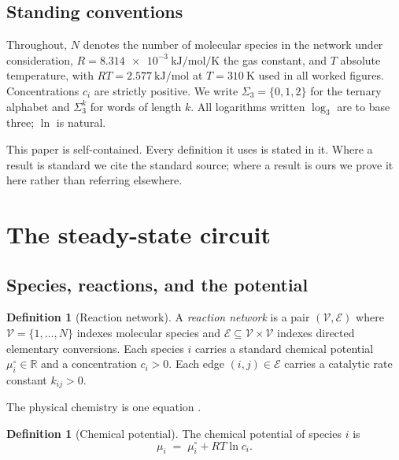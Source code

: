 \documentclass[11pt,twocolumn,a4paper]{article}
\theoremstyle{plain}
\theoremstyle{definition}
\newtheorem{definition}[theorem]{Definition}
\theoremstyle{remark}
\newcommand{\Trits}{\Sigma_3}
\newcommand{\Rset}{\mathbb{R}}
\begin{document}
\subsection{Standing conventions}

Throughout, $N$ denotes the number of molecular species in the network under
consideration, $R = \SI{8.314e-3}{\kilo\joule\per\mole\per\kelvin}$ the gas
constant, and $T$ absolute temperature, with $RT = \SI{2.577}{\kilo\joule\per\mole}$
at $T = \SI{310}{\kelvin}$ used in all worked figures. Concentrations $c_i$ are
strictly positive. We write $\Trits = \{0,1,2\}$ for the ternary alphabet and
$\Trits^k$ for words of length $k$. All logarithms written $\log_3$ are to base
three; $\ln$ is natural.

This paper is self-contained. Every definition it uses is stated in it. Where a
result is standard we cite the standard source; where a result is ours we prove
it here rather than referring elsewhere.

\section{The steady-state circuit}
\label{sec:circuit}

\subsection{Species, reactions, and the potential}

\begin{definition}[Reaction network]
\label{def:network}
A \emph{reaction network} is a pair $(\mathcal{V},\mathcal{E})$ where
$\mathcal{V} = \{1,\dots,N\}$ indexes molecular species and
$\mathcal{E}\subseteq \mathcal{V}\times\mathcal{V}$ indexes directed elementary
conversions. Each species $i$ carries a standard chemical potential
$\mu_i^\circ \in \Rset$ and a concentration $c_i > 0$. Each edge
$(i,j)\in\mathcal{E}$ carries a catalytic rate constant $k_{ij} > 0$.
\end{definition}

The physical chemistry is one equation \citep{Atkins2018}.

\begin{definition}[Chemical potential]
\label{def:mu}
The chemical potential of species $i$ is
\begin{equation}
\mu_i \;=\; \mu_i^\circ + RT\ln c_i .
\label{eq:mu}
\end{equation}
\end{definition}
\end{document}
